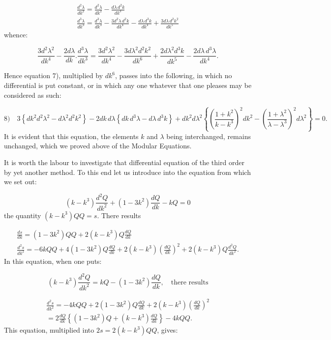 \documentclass{article}
\begin{document}
\[
\begin{gathered}
\frac{d^{2}\lambda}{dk^{2}}=\frac{d^{2}\lambda}{dk^{2}}-\frac{d\lambda\,d^{2}k}{dk^{3}}\\[1.5ex]
\frac{d^{3}\lambda}{dk^{3}}=\frac{d^{3}\lambda}{dk^{3}}-\frac{3d^{2}\lambda\,d^{2}k}{dk^{4}}-\frac{d\lambda\,d^{3}k}{dk^{4}}+\frac{3d\lambda\,d^{2}k^{2}}{dk^{5}}
\end{gathered}
\]
whence:

\[
\frac{3d^{2}\lambda^{2}}{dk^{4}}-\frac{2d\lambda}{dk}.\frac{d^{3}\lambda}{dk^{3}}=\frac{3d^{2}\lambda^{2}}{dk^{4}}-\frac{3d\lambda^{2}d^{2}k^{2}}{dk^{6}}+\frac{2d\lambda^{2}d^{3}k}{dk^{5}}-\frac{2d\lambda\,d^{3}\lambda}{dk^{4}}.
\]

Hence equation 7), multiplied by $dk^{6}$, passes into the following, in which no differential is put constant, or in which any one whatever that one pleases may be considered as such:

\[
\text{8)}\quad3\left\{dk^{2}d^{2}\lambda^{2}-d\lambda^{2}d^{2}k^{2}\right\}-2dk\,d\lambda\left\{dk\,d^{3}\lambda-d\lambda\,d^{3}k\right\}+dk^{2}d\lambda^{2}\left\{\left(\frac{1+k^{2}}{k-k^{3}}\right)^{2}dk^{2}-\left(\frac{1+\lambda^{2}}{\lambda-\lambda^{3}}\right)^{2}d\lambda^{2}\right\}=0.
\]
It is evident that this equation, the elements $k$ and $\lambda$ being interchanged, remains unchanged, which we proved above of the Modular Equations.

It is worth the labour to investigate that differential equation of the third order by yet another method. To this end let us introduce into the equation from which we set out:

\[
(k-k^{3})\frac{d^{2}Q}{dk^{2}}+(1-3k^{2})\frac{dQ}{dk}-kQ=0
\]
the quantity $(k-k^{3})QQ=s$. There results

\[
\begin{gathered}
\frac{ds}{dk}=(1-3k^{2})QQ+2(k-k^{3})Q\frac{dQ}{dk}\\[1.5ex]
\frac{d^{2}s}{dk^{2}}=-6kQQ+4(1-3k^{2})Q\frac{dQ}{dk}+2(k-k^{3})\left(\frac{dQ}{dk}\right)^{2}+2(k-k^{3})Q\frac{d^{2}Q}{dk^{2}}.
\end{gathered}
\]
In this equation, when one puts:

\[
(k-k^{3})\frac{d^{2}Q}{dk^{2}}=kQ-(1-3k^{2})\frac{dQ}{dk},\quad\text{there results}
\]

\[
\begin{gathered}
\frac{d^{2}s}{dk^{2}}=-4kQQ+2(1-3k^{2})Q\frac{dQ}{dk}+2(k-k^{3})\left(\frac{dQ}{dk}\right)^{2}\\[1.5ex]
=2\frac{dQ}{dk}\left\{(1-3k^{2})Q+(k-k^{3})\frac{dQ}{dk}\right\}-4kQQ.
\end{gathered}
\]
This equation, multiplied into $2s=2(k-k^{3})QQ$, gives:
\end{document}

